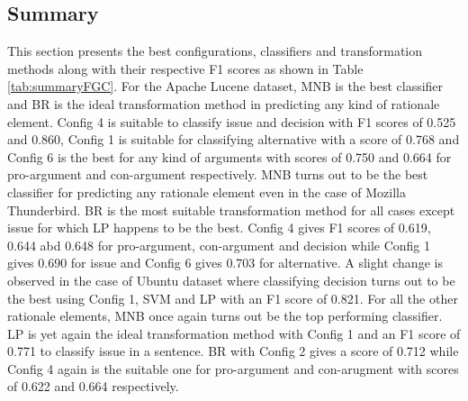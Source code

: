 \documentclass[a4paper,12pt,twoside]{report}
\begin{document}
\subsection{Summary}
This section presents the best configurations, classifiers and transformation methods along with their respective F1 scores as shown in Table \ref{tab:summaryFGC}. For the Apache Lucene dataset, \acs{MNB} is the best classifier and \acs{BR} is the ideal transformation method in predicting any kind of rationale element. Config 4 is suitable to classify issue and decision with F1 scores of 0.525 and 0.860, Config 1 is suitable for classifying alternative with a score of 0.768 and Config 6 is the best for any kind of arguments with scores of 0.750 and 0.664 for pro-argument and con-argument respectively. \acs{MNB} turns out to be the best classifier for predicting any rationale element even in the case of Mozilla Thunderbird. \acs{BR} is the most suitable transformation method for all cases except issue for which \acs{LP} happens to be the best. Config 4 gives F1 scores of 0.619, 0.644 abd 0.648 for pro-argument, con-argument and decision while Config 1 gives 0.690 for issue and Config 6 gives 0.703 for alternative. A slight change is observed in the case of Ubuntu dataset where classifying decision turns out to be the best using Config 1, \acs{SVM} and \acs{LP} with an F1 score of 0.821. For all the other rationale elements, \acs{MNB} once again turns out be the top performing classifier. \acs{LP} is yet again the ideal transformation method with Config 1 and an F1 score of 0.771 to classify issue in a sentence. \acs{BR} with Config 2 gives a score of 0.712 while Config 4 again is the suitable one for pro-argument and con-arugment with scores of 0.622 and 0.664 respectively. 
\end{document}
